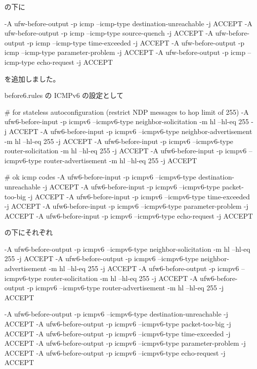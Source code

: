 \documentclass[mingoth,a4paper]{jsarticle}
\begin{document}
の下に

\begin{commandline}
-A ufw-before-output -p icmp --icmp-type destination-unreachable -j ACCEPT
-A ufw-before-output -p icmp --icmp-type source-quench -j ACCEPT
-A ufw-before-output -p icmp --icmp-type time-exceeded -j ACCEPT
-A ufw-before-output -p icmp --icmp-type parameter-problem -j ACCEPT
-A ufw-before-output -p icmp --icmp-type echo-request -j ACCEPT
\end{commandline}

を追加しました。

before6.rules の ICMPv6 の設定として

\begin{commandline}
# for stateless autoconfiguration (restrict NDP messages to hop limit of 255)
-A ufw6-before-input -p icmpv6 --icmpv6-type neighbor-solicitation -m hl --hl-eq 255 -j ACCEPT
-A ufw6-before-input -p icmpv6 --icmpv6-type neighbor-advertisement -m hl --hl-eq 255 -j ACCEPT
-A ufw6-before-input -p icmpv6 --icmpv6-type router-solicitation -m hl --hl-eq 255 -j ACCEPT
-A ufw6-before-input -p icmpv6 --icmpv6-type router-advertisement -m hl --hl-eq 255 -j ACCEPT
\end{commandline}

\begin{commandline}
# ok icmp codes
-A ufw6-before-input -p icmpv6 --icmpv6-type destination-unreachable -j ACCEPT
-A ufw6-before-input -p icmpv6 --icmpv6-type packet-too-big -j ACCEPT
-A ufw6-before-input -p icmpv6 --icmpv6-type time-exceeded -j ACCEPT
-A ufw6-before-input -p icmpv6 --icmpv6-type parameter-problem -j ACCEPT
-A ufw6-before-input -p icmpv6 --icmpv6-type echo-request -j ACCEPT
\end{commandline}

の下にそれぞれ

\begin{commandline}
-A ufw6-before-output -p icmpv6 --icmpv6-type neighbor-solicitation -m hl --hl-eq 255 -j ACCEPT
-A ufw6-before-output -p icmpv6 --icmpv6-type neighbor-advertisement -m hl --hl-eq 255 -j ACCEPT
-A ufw6-before-output -p icmpv6 --icmpv6-type router-solicitation -m hl --hl-eq 255 -j ACCEPT
-A ufw6-before-output -p icmpv6 --icmpv6-type router-advertisement -m hl --hl-eq 255 -j ACCEPT
\end{commandline}

\begin{commandline}
-A ufw6-before-output -p icmpv6 --icmpv6-type destination-unreachable -j ACCEPT
-A ufw6-before-output -p icmpv6 --icmpv6-type packet-too-big -j ACCEPT
-A ufw6-before-output -p icmpv6 --icmpv6-type time-exceeded -j ACCEPT
-A ufw6-before-output -p icmpv6 --icmpv6-type parameter-problem -j ACCEPT
-A ufw6-before-output -p icmpv6 --icmpv6-type echo-request -j ACCEPT
\end{commandline}
\end{document}
